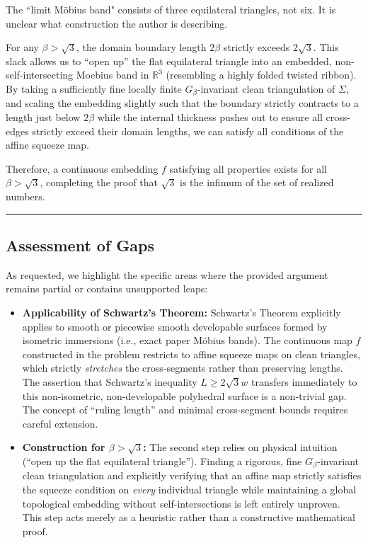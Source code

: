 \documentclass[12pt]{article}
\newcommand{\review}[1]{\begin{reviewbox}#1\end{reviewbox}}
\begin{document}
\review{The ``limit M\"obius band" consists of three equilateral triangles, not six. It is unclear what construction the author is describing.}

For any $\beta > \sqrt{3}$, the domain boundary length $2\beta$ strictly exceeds $2\sqrt{3}$. This slack allows us to ``open up'' the flat equilateral triangle into an embedded, non-self-intersecting Moebius band in $\mathbb{R}^3$ (resembling a highly folded twisted ribbon). By taking a sufficiently fine locally finite $G_{\beta}$-invariant clean triangulation of $\Sigma$, and scaling the embedding slightly such that the boundary strictly contracts to a length just below $2\beta$ while the internal thickness pushes out to ensure all cross-edges strictly exceed their domain lengths, we can satisfy all conditions of the affine squeeze map. 

Therefore, a continuous embedding $f$ satisfying all properties exists for all $\beta > \sqrt{3}$, completing the proof that $\sqrt{3}$ is the infimum of the set of realized numbers.

\vspace{2em}
\hrule
\vspace{1em}

\subsection*{Assessment of Gaps}

As requested, we highlight the specific areas where the provided argument remains partial or contains unsupported leaps:

\begin{itemize}
    \item \textbf{Applicability of Schwartz's Theorem:} Schwartz's Theorem explicitly applies to smooth or piecewise smooth developable surfaces formed by isometric immersions (i.e., exact paper M\"obius bands). The continuous map $f$ constructed in the problem restricts to affine squeeze maps on clean triangles, which strictly \emph{stretches} the cross-segments rather than preserving lengths. The assertion that Schwartz's inequality $L \ge 2\sqrt{3}w$ transfers immediately to this non-isometric, non-developable polyhedral surface is a non-trivial gap. The concept of ``ruling length'' and minimal cross-segment bounds requires careful extension.
    \item \textbf{Construction for $\beta > \sqrt{3}$:} The second step relies on physical intuition (``open up the flat equilateral triangle''). Finding a rigorous, fine $G_{\beta}$-invariant clean triangulation and explicitly verifying that an affine map strictly satisfies the squeeze condition on \emph{every} individual triangle while maintaining a global topological embedding without self-intersections is left entirely unproven. This step acts merely as a heuristic rather than a constructive mathematical proof.
\end{itemize}
\end{document}
